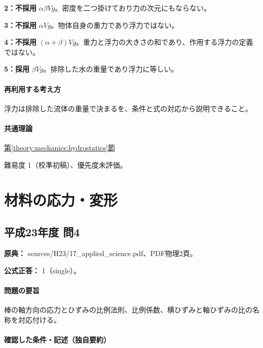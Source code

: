\noindent\textbf{2：不採用} \(\alpha\beta Vg\)。密度を二つ掛けており力の次元にもならない。\par

\noindent\textbf{3：不採用} \(\alpha Vg\)。物体自身の重力であり浮力ではない。\par

\noindent\textbf{4：不採用} \((\alpha+\beta)Vg\)。重力と浮力の大きさの和であり、作用する浮力の定義ではない。\par

\noindent\textbf{5：採用} \(\beta Vg\)。排除した水の重量であり浮力に等しい。\par

\paragraph{再利用する考え方} 浮力は排除した流体の重量で決まるを、条件と式の対応から説明できること。

\paragraph{共通理論} \hyperref[theory:mechanics:hydrostatics]{第\ref*{theory:mechanics:hydrostatics}節}

\par 難易度 1（校準初稿）、優先度未評価。

\section{材料の応力・変形}

\subsection{平成23年度 問4}
\label{q:h23-reg-applied-04}

\noindent\textbf{原典：} sources/H23/17\_applied\_science.pdf、PDF物理2頁。

\textbf{公式正答：} 1（single）。

\paragraph{問題の要旨} 棒の軸方向の応力とひずみの比例法則、比例係数、横ひずみと軸ひずみの比の名称を対応付ける。

\paragraph{確認した条件・記述（独自要約）}\mbox{}\par

